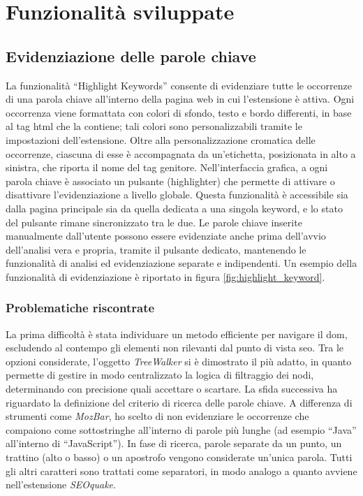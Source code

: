 \chapter{Funzionalità sviluppate}
\label{cap:funzionalità-sviluppate}

\section{Evidenziazione delle parole chiave}
\label{sec:highlight-keyword}

La funzionalità “Highlight Keywords” consente di evidenziare tutte le occorrenze di una parola chiave all’interno della pagina web in cui l’estensione è attiva. Ogni occorrenza viene formattata con colori di sfondo, testo e bordo differenti, in base al tag \gls{html} che la contiene; tali colori sono personalizzabili tramite le impostazioni dell’estensione. Oltre alla personalizzazione cromatica delle occorrenze, ciascuna di esse è accompagnata da un’etichetta, posizionata in alto a sinistra, che riporta il nome del tag genitore. Nell’interfaccia grafica, a ogni parola chiave è associato un pulsante (highlighter) che permette di attivare o disattivare l’evidenziazione a livello globale. Questa funzionalità è accessibile sia dalla pagina principale sia da quella dedicata a una singola keyword, e lo stato del pulsante rimane sincronizzato tra le due. Le parole chiave inserite manualmente dall'utente possono essere evidenziate anche prima dell’avvio dell’analisi vera e propria, tramite il pulsante dedicato, mantenendo le funzionalità di analisi ed evidenziazione separate e indipendenti. Un esempio della funzionalità di evidenziazione è riportato in figura \ref{fig:highlight_keyword}.

\subsection{Problematiche riscontrate}

La prima difficoltà è stata individuare un metodo efficiente per navigare il \gls{dom}, escludendo al contempo gli elementi non rilevanti dal punto di vista \gls{seo}. Tra le opzioni considerate, l’oggetto \textit{TreeWalker} si è dimostrato il più adatto, in quanto permette di gestire in modo centralizzato la logica di filtraggio dei nodi, determinando con precisione quali accettare o scartare. La sfida successiva ha riguardato la definizione del criterio di ricerca delle parole chiave. A differenza di strumenti come \textit{MozBar}, ho scelto di non evidenziare le occorrenze che compaiono come sottostringhe all’interno di parole più lunghe (ad esempio “Java” all’interno di “JavaScript”). In fase di ricerca, parole separate da un punto, un trattino (alto o basso) o un apostrofo vengono considerate un’unica parola. Tutti gli altri caratteri sono trattati come separatori, in modo analogo a quanto avviene nell’estensione \textit{SEOquake}.

